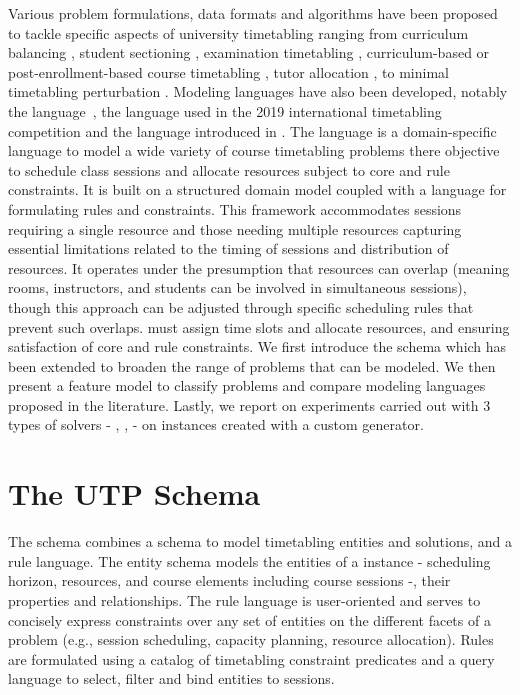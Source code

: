 \documentclass[runningheads]{llncs}
\begin{document}
Various problem formulations, data formats and algorithms have been proposed to tackle specific aspects of university timetabling 
ranging from curriculum balancing \cite{2001_castro_ARXIV,2012_chiarandini_JH,2013_rubio_MPE}, student sectioning \cite{2010_muller_AOR,2019_schindl_AOR}, examination timetabling \cite{1996_carter_JORS,2020_battistutta_CPAIOR,2010_mccollum_INFORMS}, curriculum-based or post-enrollment-based course timetabling \cite{2010_mccollum_INFORMS,2015_bettinelli_TOP,2007_lewis_ITC,2012_cambazard_AOR,2017_goh_EJOR,2021_chen_IEEEA}, tutor allocation \cite{2022_caselli_ESWA}, to minimal timetabling perturbation \cite{2019_lindahl_EJOR,2020_lemos_JS}. 
Modeling languages have also been developed, notably the {\XHSTT} language~\cite{2012_ahmadi_AOR}, the {\ITC} language used in the 2019 international timetabling competition \cite{2018_muller_PATAT,2019_ITC} and the {\UTP} language introduced in \cite{2022_barichard_PATAT}.
The {\UTP} language is a domain-specific language to model a wide variety of course timetabling problems 
there objective to schedule class sessions and allocate resources
 subject to core and rule constraints. 
It is built on a structured domain model coupled with a language for formulating rules and constraints. This framework accommodates sessions requiring a single resource 
and those needing multiple resources 
capturing essential limitations related to the timing of sessions and distribution of resources. 
It operates under the presumption that resources can overlap (meaning rooms, instructors, and students can be involved in simultaneous sessions), though this approach can be adjusted through specific scheduling rules that prevent such overlaps. \UTP{} must assign time slots and allocate resources, and ensuring satisfaction of core and rule constraints. We first introduce the {\UTP} schema which has been extended to broaden the range of problems that can be modeled. 
We then present a feature model to classify problems and compare modeling languages proposed in the literature. 
Lastly, we report on experiments carried out with 3 types of solvers - {\CP}, {\ASP}, {\MIP} -
on instances created with a custom generator. 



 \section{The UTP Schema}
\label{sec:schema}
The \UTP{} schema combines a schema to model timetabling entities and solutions, 
and a rule language.
The entity schema models the entities of a \UTP{} instance
- scheduling horizon, resources, and course elements including course sessions -,
their properties and relationships.
The rule language is user-oriented
and serves to concisely express constraints
over any set of entities
on the different facets of a problem (e.g., session scheduling, capacity planning, resource allocation).
Rules are formulated
using a catalog of timetabling constraint predicates
and a query language to select, filter and bind entities to sessions. 
\end{document}
